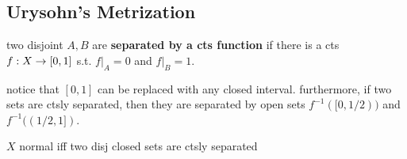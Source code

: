 \subsection{Urysohn's Metrization} \vspace{-3mm}
 \vspace{-2mm}

\begin{defn}
    two disjoint $A,B$ are \textbf{separated by a cts function} if
    there is a cts $f:X\rightarrow[0,1]$ s.t. $f\rvert_{A}=0$ and $f\rvert_{B}=1$.
\end{defn}

notice that $[0,1]$ can be replaced with any closed interval.
furthermore, if two sets are ctsly separated, then they are separated by open
sets $f^{-1}([0,1/2))$ and $f^{-1}((1/2,1])$.

\begin{lm}[title=Urysohn's Lemma]
    $X$ normal iff two disj closed sets are ctsly separated
\end{lm}

